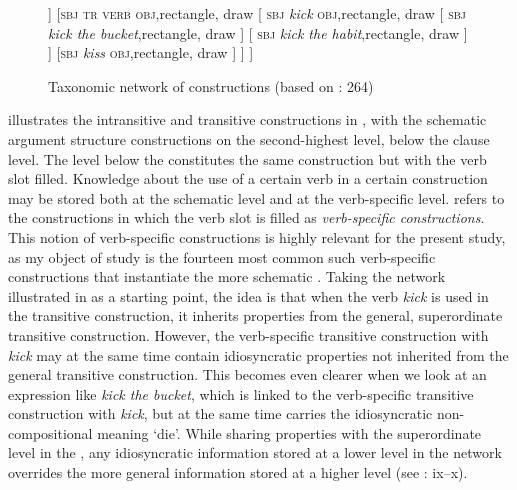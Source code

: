 \documentclass[output=paper]{langscibook}
\begin{document}
  


\begin{figure}
\caption{Taxonomic network of constructions (based on \citealt{CroftCruse2004}: 264)}
\label{fig:valdeson:1}

\begin{forest}
[\textsc{clause},rectangle,draw
	[\textsc{sbj} \textsc{intr} \textsc{verb}, rectangle, draw
		[\textsc{sbj} \textit{sleep},rectangle,draw
		]
		[\textsc{sbj} \textit{run},rectangle, draw
		]
	]
	[\textsc{sbj} \textsc{tr} \textsc{verb} \textsc{obj},rectangle, draw
		[
		\textsc{sbj} \textit{kick} \textsc{obj},rectangle, draw 
			[
			\textsc{sbj} \textit{kick the bucket},rectangle, draw
			]
			[
			\textsc{sbj} \textit{kick the habit},rectangle, draw
			]
		]
		[\textsc{sbj} \textit{kiss} \textsc{obj},rectangle, draw
		]
	]
]
\end{forest}
\end{figure}


 illustrates the intransitive and transitive constructions in , with the schematic argument structure constructions on the second-highest level, below the clause level. The level below the  constitutes the same construction but with the verb slot filled. Knowledge about the use of a certain verb in a certain construction may be stored both at the schematic level and at the verb-specific level. \citet[25]{Croft2001} refers to the constructions in which the verb slot is filled as \textit{verb-specific constructions}. This notion of verb-specific constructions is highly relevant for the present study, as my object of study is the fourteen most common such verb-specific constructions that instantiate the more schematic . Taking the network illustrated in  as a starting point, the idea is that when the verb \textit{kick} is used in the transitive construction, it inherits properties from the general, superordinate transitive construction. However, the verb-specific transitive construction with \textit{kick} may at the same time contain idiosyncratic properties not inherited from the general transitive construction. This becomes even clearer when we look at an expression like \textit{kick the bucket}, which is linked to the verb-specific transitive construction with \textit{kick}, but at the same time carries the idiosyncratic non-compositional meaning ‘die’. While sharing properties with the superordinate level in the , any idiosyncratic information stored at a lower level in the network overrides the more general information stored at a higher level (see \citealt{KemmerBarlow2000}: ix–x).
\end{document}
